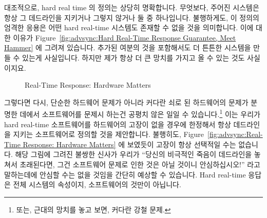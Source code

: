 대조적으로, hard real time 의 정의는 상당히 명확합니다.
무엇보다, 주어진 시스템은 항상 그 데드라인을 지키거나 그렇지 않거나 둘 중
하나입니다.
불행하게도, 이 정의의 엄격한 응용은 어떤 hard real-time 시스템도 존재할 수 없을
것을 의미합니다.
이에 대한 이유가
Figure~\ref{fig:advsync:Hard Real-Time Response Guarantee, Meet Hammer} 에
그려져 있습니다.
추가된 여분의 것을 포함해서도 더 튼튼한 시스템을 만들 수 있는게 사실입니다.
하지만 제가 항상 더 큰 망치를 가지고 올 수 있는 것도 사실이지요.

\begin{figure}[bt]
\centering
{}
\caption{Real-Time Response: Hardware Matters}
\end{figure}

그렇다면 다시, 단순한 하드웨어 문제가 아니라 커다란 쇠로 된 하드웨어의 문제가
분명한 데에서 소프트웨어를 문제시 하는건 공평치 않은 일일 수
있습니다.\footnote{
	또는, 근대의 망치를 놓고 보면, 커다란 강철 문제.}
이는 우리가 hard real-time 소프트웨어를 하드웨어의 고장이 없을 경우에 한정해서
항상 데드라인을 지키는 소프트웨어로 정의할 것을 제안합니다.
불행히도,
Figure~\ref{fig:advsync:Real-Time Response: Hardware Matters} 에 보였듯이
고장이 항상 선택적일 수는 없습니다.
해당 그림에 그려진 불쌍한 신사가 우리가 ``당신의 비극적인 죽음이 데드라인을
놓쳐서 초래된다면, 그건 소프트웨어 문제로 인한 것은 아닐 것이니 안심하십시오!''
라고 말하는데에 안심할 수는 없을 것임을 간단히 예상할 수 있습니다.
Hard real-time 응답은 전체 시스템의 속성이지, 소프트웨어의 것만이 아닙니다.

